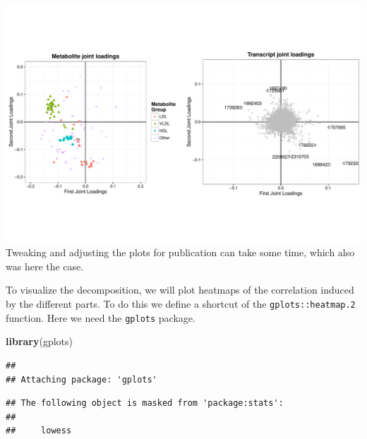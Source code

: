 \documentclass[]{article}
\newenvironment{Shaded}{\begin{snugshade}}{\end{snugshade}}
\newcommand{\KeywordTok}[1]{\textcolor[rgb]{0.13,0.29,0.53}{\textbf{{#1}}}}
\newcommand{\DataTypeTok}[1]{\textcolor[rgb]{0.13,0.29,0.53}{{#1}}}
\newcommand{\DecValTok}[1]{\textcolor[rgb]{0.00,0.00,0.81}{{#1}}}
\newcommand{\FloatTok}[1]{\textcolor[rgb]{0.00,0.00,0.81}{{#1}}}
\newcommand{\StringTok}[1]{\textcolor[rgb]{0.31,0.60,0.02}{{#1}}}
\newcommand{\OtherTok}[1]{\textcolor[rgb]{0.56,0.35,0.01}{{#1}}}
\newcommand{\NormalTok}[1]{{#1}}
\begin{document}
\includegraphics{Figs/Loadings plot-1.pdf} Tweaking and adjusting the
plots for publication can take some time, which also was here the case.

To visualize the decomposition, we will plot heatmaps of the correlation
induced by the different parts. To do this we define a shortcut of the
\texttt{gplots::heatmap.2} function. Here we need the \texttt{gplots}
package.

\begin{Shaded}
\begin{Highlighting}[]
\KeywordTok{library}\NormalTok{(gplots)}
\end{Highlighting}
\end{Shaded}

\begin{verbatim}
## 
## Attaching package: 'gplots'
\end{verbatim}

\begin{verbatim}
## The following object is masked from 'package:stats':
## 
##     lowess
\end{verbatim}

\begin{Shaded}
\end{Shaded}
\end{document}

